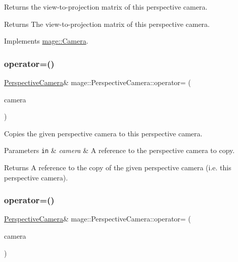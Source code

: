 Returns the view-\/to-\/projection matrix of this perspective camera.

\begin{DoxyReturn}{Returns}
The view-\/to-\/projection matrix of this perspective camera. 
\end{DoxyReturn}


Implements \hyperlink{classmage_1_1_camera_a1f5206864cf18b5548219492556df5d2}{mage\+::\+Camera}.

\hypertarget{classmage_1_1_perspective_camera_a8c0189ff4f12ebe7108450a9a57ac07c}{}\label{classmage_1_1_perspective_camera_a8c0189ff4f12ebe7108450a9a57ac07c} 
\subsubsection{\texorpdfstring{operator=()}{operator=()}\hspace{0.1cm}{\footnotesize\ttfamily [1/2]}}
{\footnotesize\ttfamily \hyperlink{classmage_1_1_perspective_camera}{Perspective\+Camera}\& mage\+::\+Perspective\+Camera\+::operator= (\begin{DoxyParamCaption}\item[{const \hyperlink{classmage_1_1_perspective_camera}{Perspective\+Camera} \&}]{camera }\end{DoxyParamCaption})\hspace{0.3cm}{\ttfamily [default]}}

Copies the given perspective camera to this perspective camera.


\begin{DoxyParams}[1]{Parameters}
\mbox{\tt in}  & {\em camera} & A reference to the perspective camera to copy. \\
\hline
\end{DoxyParams}
\begin{DoxyReturn}{Returns}
A reference to the copy of the given perspective camera (i.\+e. this perspective camera). 
\end{DoxyReturn}
\hypertarget{classmage_1_1_perspective_camera_af2be66beb3029aa644f3f38461b318af}{}\label{classmage_1_1_perspective_camera_af2be66beb3029aa644f3f38461b318af} 
\subsubsection{\texorpdfstring{operator=()}{operator=()}\hspace{0.1cm}{\footnotesize\ttfamily [2/2]}}
{\footnotesize\ttfamily \hyperlink{classmage_1_1_perspective_camera}{Perspective\+Camera}\& mage\+::\+Perspective\+Camera\+::operator= (\begin{DoxyParamCaption}\item[{\hyperlink{classmage_1_1_perspective_camera}{Perspective\+Camera} \&\&}]{camera }\end{DoxyParamCaption})\hspace{0.3cm}{\ttfamily [default]}}

